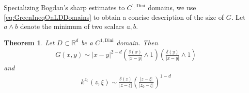 \documentclass[a4paper,12pt]{article}
\newtheorem{theorem}{Theorem}[section]
\theoremstyle{definition}
\theoremstyle{definition}
\begin{document}
	Specializing Bogdan's sharp estimates to $C^{1,\mathrm{Dini}}$ domains, we use \eqref{eq:GreenIneqOnLDDomains} to obtain a concise description of the size of $G$. Let $a\wedge b$ denote the minimum of two scalars $a,b$.
	\begin{theorem}\label{thm:BogdanLD}
		Let $D\subset\mathbb R^d$ be a $C^{1,\mathrm{Dini}}$ domain. Then
		\begin{align}\label{eq:GreenFuncEstLD}
			G(x,y)\sim|x-y|^{2-d}\left(\frac{\delta(x)}{|x-y|}\wedge 1\right)\left(\frac{\delta(y)}{|x-y|}\wedge 1\right)
		\end{align}
		and
		\begin{align}\label{eq:MartinKernelDiniDom}
			k^{z_0}(z,\xi)\sim\frac{\delta(z)}{|z-\xi|}\left(\frac{|z-\xi|}{|z_0-\xi|}\right)^{1-d}
		\end{align}
	\end{theorem}
\end{document}
